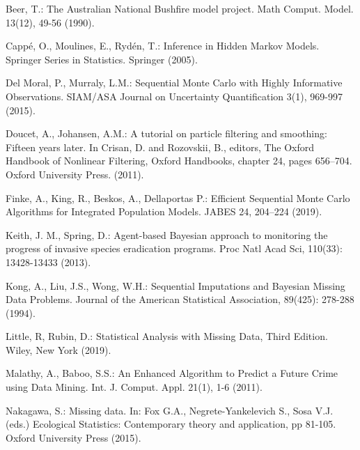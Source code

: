 \begin{thebibliography}{}

Beer, T.: The Australian National Bushfire model project. Math Comput. Model. 13(12), 49-56 (1990).

Capp\'{e}, O., Moulines, E., Ryd\'{e}n, T.: Inference in Hidden Markov Models. Springer Series in Statistics. Springer (2005).

Del Moral, P., Murraly, L.M.: Sequential Monte Carlo with Highly Informative Observations. SIAM/ASA Journal on Uncertainty Quantification 3(1), 969-997 (2015).

Doucet, A., Johansen, A.M.: A tutorial on particle filtering and smoothing: Fifteen years later. In Crisan, D. and Rozovskii, B., editors, The Oxford Handbook of Nonlinear Filtering, Oxford Handbooks, chapter 24, pages 656–704. Oxford University Press. (2011).

Finke, A., King, R., Beskos, A., Dellaportas P.: Efficient Sequential Monte Carlo Algorithms for Integrated Population Models. JABES 24, 204–224 (2019).

 Keith, J. M., Spring, D.: Agent-based Bayesian approach to monitoring the progress of invasive species eradication programs. Proc Natl Acad Sci, 110(33): 13428-13433 (2013).

 Kong, A., Liu, J.S., Wong, W.H.: Sequential Imputations and Bayesian Missing Data Problems. Journal of the American Statistical Association, 89(425): 278-288 (1994).

 Little, R, Rubin, D.: Statistical Analysis with Missing Data, Third Edition. Wiley, New York (2019).

Malathy, A., Baboo, S.S.: An Enhanced Algorithm to Predict a Future Crime using Data Mining. Int. J. Comput. Appl. 21(1), 1-6 (2011).

Nakagawa, S.: Missing data. In: Fox G.A., Negrete-Yankelevich S., Sosa V.J. (eds.) Ecological Statistics: Contemporary theory and application, pp 81-105. Oxford University Press (2015). 


\end{thebibliography}
